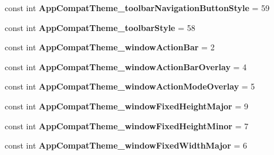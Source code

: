 \begin{DoxyCompactItemize}
const int {\bfseries App\+Compat\+Theme\+\_\+toolbar\+Navigation\+Button\+Style} = 59
\item 
\mbox{\label{class_sample_app_1_1_droid_1_1_resource_1_1_styleable_a766a56f5da84ae8156c589b5e0621c49}} 
const int {\bfseries App\+Compat\+Theme\+\_\+toolbar\+Style} = 58
\item 
\mbox{\label{class_sample_app_1_1_droid_1_1_resource_1_1_styleable_a6196519ba03eed8e52f0e225b694ee18}} 
const int {\bfseries App\+Compat\+Theme\+\_\+window\+Action\+Bar} = 2
\item 
\mbox{\label{class_sample_app_1_1_droid_1_1_resource_1_1_styleable_a4e6fd24c3ec65a03b7e957a31439f3a8}} 
const int {\bfseries App\+Compat\+Theme\+\_\+window\+Action\+Bar\+Overlay} = 4
\item 
\mbox{\label{class_sample_app_1_1_droid_1_1_resource_1_1_styleable_a0e45e455bfcf409ec31981f26f9c0052}} 
const int {\bfseries App\+Compat\+Theme\+\_\+window\+Action\+Mode\+Overlay} = 5
\item 
\mbox{\label{class_sample_app_1_1_droid_1_1_resource_1_1_styleable_ab620e10de2950e7ade7737f50a7b45ac}} 
const int {\bfseries App\+Compat\+Theme\+\_\+window\+Fixed\+Height\+Major} = 9
\item 
\mbox{\label{class_sample_app_1_1_droid_1_1_resource_1_1_styleable_a0e57c4b9a248a901bcc6ba6eea83b407}} 
const int {\bfseries App\+Compat\+Theme\+\_\+window\+Fixed\+Height\+Minor} = 7
\item 
\mbox{\label{class_sample_app_1_1_droid_1_1_resource_1_1_styleable_ad5444c72b74dd1ddae3a7769e7f8f5a4}} 
const int {\bfseries App\+Compat\+Theme\+\_\+window\+Fixed\+Width\+Major} = 6
\item 
\mbox{\label{class_sample_app_1_1_droid_1_1_resource_1_1_styleable_aa7eb27cac957568cc05531ce8033edc2}} 

\end{DoxyCompactItemize}
